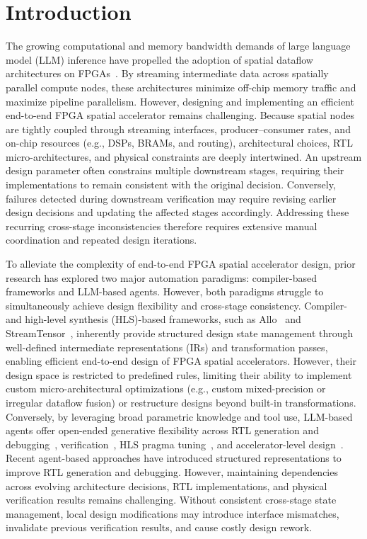 \documentclass[9pt,conference]{IEEEtran}
\begin{document}
\section{Introduction}
The growing computational and memory bandwidth demands of large language model (LLM) inference have propelled the adoption of spatial dataflow architectures on FPGAs~\cite{streamtensor}. By streaming intermediate data across spatially parallel compute nodes, these architectures minimize off-chip memory traffic and maximize pipeline parallelism. However, designing and implementing an efficient end-to-end FPGA spatial accelerator remains challenging. Because spatial nodes are tightly coupled through streaming interfaces, producer–consumer rates, and on-chip resources (e.g., DSPs, BRAMs, and routing), architectural choices, RTL micro-architectures, and physical constraints are deeply intertwined. An upstream design parameter often constrains multiple downstream stages, requiring their implementations to remain consistent with the original decision. Conversely, failures detected during downstream verification may require revising earlier design decisions and updating the affected stages accordingly. Addressing these recurring cross-stage inconsistencies therefore requires extensive manual coordination and repeated design iterations.

To alleviate the complexity of end-to-end FPGA spatial accelerator design, prior research has explored two major automation paradigms: compiler-based frameworks and LLM-based agents. However, both paradigms struggle to simultaneously achieve design flexibility and cross-stage consistency. Compiler- and high-level synthesis (HLS)-based frameworks, such as Allo~\cite{allo} and StreamTensor~\cite{streamtensor}, inherently provide structured design state management through well-defined intermediate representations (IRs) and transformation passes, enabling efficient end-to-end design of FPGA spatial accelerators. However, their design space is restricted to predefined rules, limiting their ability to implement custom micro-architectural optimizations (e.g., custom mixed-precision or irregular dataflow fusion) or restructure designs beyond built-in transformations. Conversely, by leveraging broad parametric knowledge and tool use, LLM-based agents offer open-ended generative flexibility across RTL generation and debugging~\cite{mage,rtlfixer}, verification~\cite{assertllm,correctbench}, HLS pragma tuning~\cite{hlspilot}, and accelerator-level design~\cite{mahl,gpt4aigchip,designconductor2}. Recent agent-based approaches have introduced
structured representations to improve RTL
generation and debugging. However, maintaining
dependencies across evolving architecture decisions,
RTL implementations, and physical verification
results remains challenging. Without consistent
cross-stage state management, local design
modifications may introduce interface mismatches,
invalidate previous verification results, and
cause costly design rework.
\end{document}
